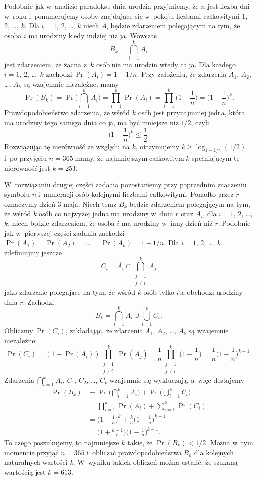 
\exercise %
Podobnie jak w~analizie paradoksu dnia urodzin przyjmiemy, że $n$ jest liczbą dni w~roku i~ponumerujemy osoby znajdujące się w~pokoju liczbami całkowitymi 1, 2, \dots, $k$.
Dla $i=1$, 2, \dots, $k$ niech $A_i$ będzie zdarzeniem polegającym na tym, że osoba $i$ ma urodziny kiedy indziej niż ja.
Wówczas
\[
	B_k = \bigcap_{i=1}^kA_i
\]
jest zdarzeniem, że żadna z~$k$ osób nie ma urodzin wtedy co ja.
Dla każdego $i=1$, 2, \dots, $k$ zachodzi $\Pr(A_i)=1-1/n$.
Przy założeniu, że zdarzenia $A_1$, $A_2$, \dots, $A_k$ są wzajemnie niezależne, mamy
\[
	\Pr(B_k) = \Pr\biggl(\bigcap_{i=1}^kA_i\biggr) = \prod_{i=1}^k\Pr(A_i) = \prod_{i=1}^k\biggl(1-\frac{1}{n}\biggr) = \biggl(1-\frac{1}{n}\biggr)^k.
\]
Prawdopodobieństwo zdarzenia, że wśród $k$ osób jest przynajmniej jedna, która ma urodziny tego samego dnia co ja, ma być mniejsze niż $1/2$, czyli
\[
	\biggl(1-\frac{1}{n}\biggr)^k \le \frac{1}{2}.
\]
Rozwiązując tę nierówność ze względu na $k$, otrzymujemy $k\ge\log_{1-1/n}(1/2)$ i~po przyjęciu $n=365$ mamy, że najmniejszym całkowitym $k$ spełniającym tę nierówność jest $k=253$.

W~rozwiązaniu drugiej części zadania pozostaniemy przy poprzednim znaczeniu symbolu $n$ i~numeracji osób kolejnymi liczbami całkowitymi.
Ponadto przez $r$ oznaczymy dzień 3 maja.
Niech teraz $B_k$ będzie zdarzeniem polegającym na tym, że wśród $k$ osób co najwyżej jedna ma urodziny w~dniu $r$ oraz $A_i$, dla $i=1$, 2, \dots, $k$, niech będzie zdarzeniem, że osoba $i$ ma urodziny w~inny dzień niż $r$.
Podobnie jak w~pierwszej części zadania zachodzi $\Pr(A_1)=\Pr(A_2)=\dots=\Pr(A_k)=1-1/n$.
Dla $i=1$, 2, \dots, $k$ zdefiniujmy jeszcze
\[
	C_i = \overline{A_i}\cap\bigcap_{\substack{j=1\\j\ne i}}^kA_j
\]
jako zdarzenie polegające na tym, że wśród $k$ osób tylko $i$\nbhyphen ta obchodzi urodziny dnia $r$.
Zachodzi
\[
	B_k = \bigcap_{i=1}^kA_i\cup\bigcup_{i=1}^kC_i.
\]
Obliczmy $\Pr(C_i)$, zakładając, że zdarzenia $A_1$, $A_2$, \dots, $A_k$ są wzajemnie niezależne:
\[
	\Pr(C_i) = (1-\Pr(A_i))\prod_{\substack{j=1\\j\ne i}}^k\Pr(A_j) = \frac{1}{n}\prod_{\substack{j=1\\j\ne i}}^k\biggl(1-\frac{1}{n}\biggr) = \frac{1}{n}\biggl(1-\frac{1}{n}\biggr)^{k-1}.
\]
Zdarzenia $\bigcap_{i=1}^kA_i$, $C_1$, $C_2$, \dots, $C_k$ wzajemnie się wykluczają, a~więc dostajemy
\begin{align*}
	\Pr(B_k) &= \Pr\biggl(\bigcap_{i=1}^kA_i\biggr)+\Pr\biggl(\bigcup_{i=1}^kC_i\biggr) \\
	&= \prod_{i=1}^k\Pr(A_i)+\sum_{i=1}^k\Pr(C_i) \\
	&= \biggl(1-\frac{1}{n}\biggr)^k+\frac{k}{n}\biggl(1-\frac{1}{n}\biggr)^{k-1} \\
	&= \biggl(1+\frac{k-1}{n}\biggr)\biggl(1-\frac{1}{n}\biggr)^{k-1}.
\end{align*}
To czego poszukujemy, to najmniejsze $k$ takie, że $\Pr(B_k)<1/2$.
Można w~tym momencie przyjąć $n=365$ i~obliczać prawdopodobieństwa $B_k$ dla kolejnych naturalnych wartości $k$.
W~wyniku takich obliczeń można ustalić, że szukaną wartością jest $k=613$.

